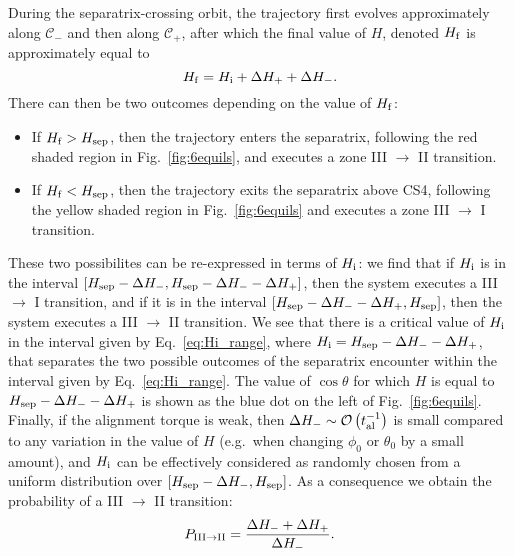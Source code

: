 \documentclass[
        fleqn,
        usenatbib,
    ]{mnras}
\newcommand*{\p}[1]{\left(#1\right)}
\newcommand*{\s}[1]{\left[#1\right]}
\begin{document}
During the separatrix-crossing orbit, the trajectory first evolves
approximately along $\mathcal{C}_-$ and then along $\mathcal{C}_+$, after which
the final value of $H$, denoted $H_{\rm f}$ is approximately equal to
\begin{equation}
    H_{\rm f} = H_{\rm i} + \Delta H_+ + \Delta H_-.
\end{equation}
There can then be two outcomes depending on the value of $H_{\rm f}$:
\begin{itemize}
    \item If $H_{\rm f} > H_{\rm sep}$, then the trajectory enters the
        separatrix, following the red shaded region in Fig.~\ref{fig:6equils},
        and executes a zone III $\to$ II transition.

    \item If $H_{\rm f} < H_{\rm sep}$, then the trajectory exits the separatrix
        above CS4, following the yellow shaded region in Fig.~\ref{fig:6equils}
        and executes a zone III $\to$ I transition.
\end{itemize}
These two possibilites can be re-expressed in terms of $H_{\rm i}$: we find that
if $H_{\rm i}$ is in the interval $\s{H_{\rm sep} - \Delta H_-, H_{\rm sep} -
\Delta H_{-} - \Delta H_+}$, then the system executes a III $\to$ I transition,
and if it is in the interval $\s{H_{\rm sep} - \Delta H_- - \Delta H_+, H_{\rm
sep}}$, then the system executes a III $\to$ II transition. We see that there is
a critical value of $H_{\rm i}$ in the interval given by
Eq.~\eqref{eq:Hi_range}, where $H_{\rm i} = H_{\rm sep} - \Delta H_{-} - \Delta
H_+$, that separates the two possible outcomes of the separatrix encounter
within the interval given by Eq.~\eqref{eq:Hi_range}. The value of $\cos \theta$
for which $H$ is equal to $H_{\rm sep} - \Delta H_{-} - \Delta H_+$ is shown as
the blue dot on the left of Fig.~\ref{fig:6equils}. Finally, if the alignment
torque is weak, then $\Delta H_- \sim \mathcal{O}\p{t_{\rm al}^{-1}}$ is small
compared to any variation in the value of $H$ (e.g.\ when changing $\phi_0$ or
$\theta_0$ by a small amount), and $H_{\rm i}$ can be effectively considered as
randomly chosen from a uniform distribution over $\s{H_{\rm sep} - \Delta H_-,
H_{\rm sep}}$. As a consequence we obtain the probability of a III $\to$ II
transition:
\begin{equation}
    P_{\rm III \to II} = \frac{\Delta H_- + \Delta H_+}{\Delta H_-}.
        \label{eq:def_P32_toy}
\end{equation}
\end{document}

